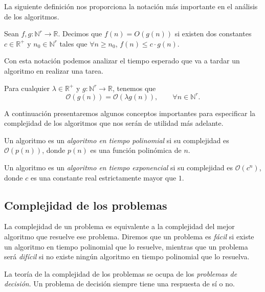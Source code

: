 La siguiente definición nos proporciona la notación más importante en el análisis de los algoritmos.

\begin{definition}
    Sean $f, g : \mathbb{N}^r \longrightarrow \mathbb{R}$. Decimos que $f(n) = O(g(n))$ si existen dos constantes $c \in \mathbb{R}^+$ y $n_0 \in \mathbb{N}^r$ tales que $\forall n \geq n_0$, $f(n) \leq c \cdot g(n)$.
\end{definition}

Con esta notación podemos analizar el tiempo esperado que va a tardar un algoritmo en realizar una tarea.

\begin{proposition}
    Para cualquier $\lambda \in \mathbb{R}^+$ y $g : \mathbb{N}^r \longrightarrow \mathbb{R}$, tenemos que
    \[
        \mathcal{O}(g(n)) = \mathcal{O}(\lambda g(n)), \qquad \forall n \in \mathbb{N}^r.
    \]
\end{proposition}

A continuación presentaremos algunos conceptos importantes para especificar la complejidad de los algoritmos que nos serán de utilidad más adelante.

\begin{definition}
    Un algoritmo es un \emph{algoritmo en tiempo polinomial} si su complejidad es $\mathcal{O}(p(n))$, donde $p(n)$ es una función polinómica de $n$.
\end{definition}

\begin{definition}
    Un algoritmo es un \emph{algoritmo en tiempo exponencial} si su complejidad es $\mathcal{O}(c^n)$, donde $c$ es una constante real estrictamente mayor que $1$.
\end{definition}

\subsection{Complejidad de los problemas}

La complejidad de un problema es equivalente a la complejidad del mejor algoritmo que resuelve ese problema. Diremos que un problema es \emph{fácil} si existe un algoritmo en tiempo polinomial que lo resuelve, mientras que un problema será \emph{difícil} si no existe ningún algoritmo en tiempo polinomial que lo resuelva.

La teoría de la complejidad de los problemas se ocupa de los \emph{problemas de decisión}. Un problema de decisión siempre tiene una respuesta de sí o no.

